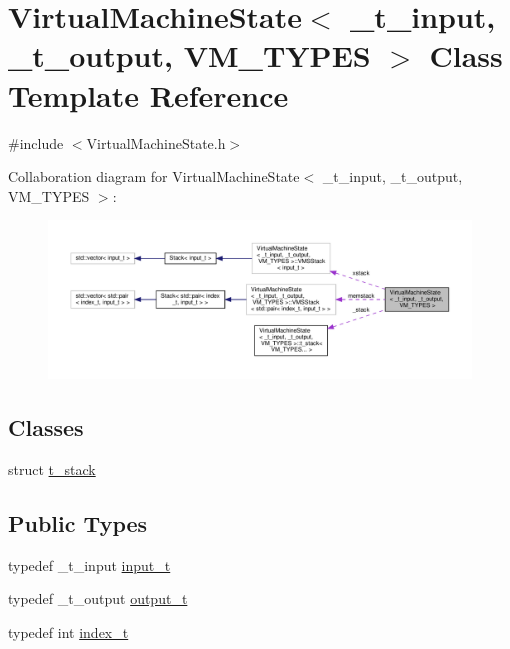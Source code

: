 \hypertarget{class_virtual_machine_state}{}\section{Virtual\+Machine\+State$<$ \+\_\+t\+\_\+input, \+\_\+t\+\_\+output, V\+M\+\_\+\+T\+Y\+P\+ES $>$ Class Template Reference}
\label{class_virtual_machine_state}


{\ttfamily \#include $<$Virtual\+Machine\+State.\+h$>$}



Collaboration diagram for Virtual\+Machine\+State$<$ \+\_\+t\+\_\+input, \+\_\+t\+\_\+output, V\+M\+\_\+\+T\+Y\+P\+ES $>$\+:
\nopagebreak
\begin{figure}[H]
\begin{center}
\leavevmode
\includegraphics[width=350pt]{class_virtual_machine_state__coll__graph}
\end{center}
\end{figure}
\subsection*{Classes}
\begin{DoxyCompactItemize}
\item 
struct \hyperlink{struct_virtual_machine_state_1_1t__stack}{t\+\_\+stack}
\end{DoxyCompactItemize}
\subsection*{Public Types}
\begin{DoxyCompactItemize}
\item 
typedef \+\_\+t\+\_\+input \hyperlink{class_virtual_machine_state_a04c5592dddd5b9ffdae5a509d73127dd}{input\+\_\+t}
\item 
typedef \+\_\+t\+\_\+output \hyperlink{class_virtual_machine_state_a005a025f97d9505b00e7f9f0e99002bb}{output\+\_\+t}
\item 
typedef int \hyperlink{class_virtual_machine_state_a95ba2f54f65b778c8a012ea3e7a0ee50}{index\+\_\+t}
\end{DoxyCompactItemize}
